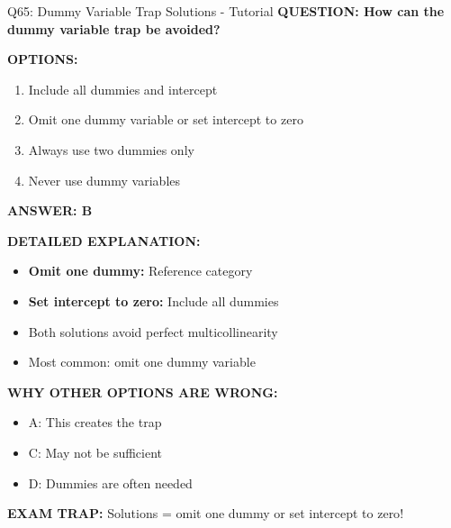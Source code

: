 \documentclass[8pt]{beamer}
\begin{document}
	\begin{frame}{Q65: Dummy Variable Trap Solutions - Tutorial}
		\fontsize{6.5}{7.5}\selectfont
		\textbf{QUESTION: How can the dummy variable trap be avoided?}
		
		\vspace{0.1cm}
		\textbf{OPTIONS:}
		\begin{enumerate}
			\item Include all dummies and intercept
			\item Omit one dummy variable or set intercept to zero
			\item Always use two dummies only
			\item Never use dummy variables
		\end{enumerate}
		
		\vspace{0.1cm}
		\textcolor{myblue}{\textbf{ANSWER: B}}
		
		\vspace{0.1cm}
		\textbf{DETAILED EXPLANATION:}
		\begin{itemize}
			\item \textbf{Omit one dummy:} Reference category
			\item \textbf{Set intercept to zero:} Include all dummies
			\item Both solutions avoid perfect multicollinearity
			\item Most common: omit one dummy variable
		\end{itemize}
		
		\vspace{0.1cm}
		\textcolor{myred}{\textbf{WHY OTHER OPTIONS ARE WRONG:}}
		\begin{itemize}
			\item \textcolor{myred}{A:} This creates the trap
			\item \textcolor{myred}{C:} May not be sufficient
			\item \textcolor{myred}{D:} Dummies are often needed
		\end{itemize}
		
		\textcolor{myred}{\textbf{EXAM TRAP:}} Solutions = \textcolor{myblue}{omit one dummy or set intercept to zero}!
	\end{frame}
	
\end{document}
